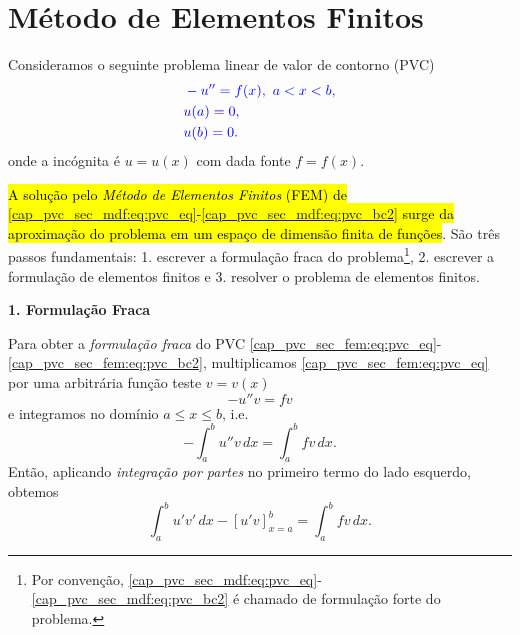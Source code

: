 \section{Método de Elementos Finitos}\label{cap_pvc_sec_fem}

Consideramos o seguinte problema linear de valor de contorno (PVC)
\begin{subequations}\label{cap_pvc_sec_fem:eq:pvc}\hleq
  \begin{align}
    &-u'' = f(x), ~a < x < b, \label{cap_pvc_sec_fem:eq:pvc_eq}\\
    &u(a) = 0, \label{cap_pvc_sec_fem:eq:pvc_bc1}\\
    &u(b) = 0. \label{cap_pvc_sec_fem:eq:pvc_bc2}
  \end{align}
\end{subequations}
onde a incógnita é $u = u(x)$ com dada fonte $f = f(x)$.

\hl{A solução pelo \emph{Método de Elementos Finitos} (FEM) de {\eqref{cap_pvc_sec_mdf:eq:pvc_eq}}-{\eqref{cap_pvc_sec_mdf:eq:pvc_bc2}} surge da aproximação do problema em um espaço de dimensão finita de funções}. São três passos fundamentais: 1. escrever a formulação fraca do problema\footnote{Por convenção, {\eqref{cap_pvc_sec_mdf:eq:pvc_eq}}-{\eqref{cap_pvc_sec_mdf:eq:pvc_bc2}} é chamado de formulação forte do problema.}, 2. escrever a formulação de elementos finitos e 3. resolver o problema de elementos finitos.

\begin{flushleft}
  \textbf{1. Formulação Fraca}
\end{flushleft}

Para obter a \emph{formulação fraca} do PVC {\eqref{cap_pvc_sec_fem:eq:pvc_eq}}-{\eqref{cap_pvc_sec_fem:eq:pvc_bc2}}, multiplicamos \eqref{cap_pvc_sec_fem:eq:pvc_eq} por uma arbitrária função teste $v = v(x)$
\begin{equation}
  -u''v = fv
\end{equation}
e integramos no domínio $a \leq x \leq b$, i.e.
\begin{equation}
    -\int_a^bu''v\,dx = \int_a^bfv\,dx.
\end{equation}
Então, aplicando \emph{integração por partes} no primeiro termo do lado esquerdo, obtemos
\begin{equation}
    \int_a^bu'v'\,dx - \left[u'v\right]_{x=a}^b = \int_a^bfv\,dx.
\end{equation}

